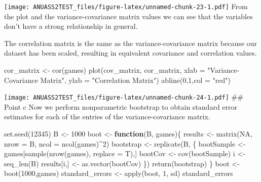 \documentclass[
]{article}
\newenvironment{Shaded}{\begin{snugshade}}{\end{snugshade}}
\newcommand{\AttributeTok}[1]{\textcolor[rgb]{0.77,0.63,0.00}{#1}}
\newcommand{\ConstantTok}[1]{\textcolor[rgb]{0.00,0.00,0.00}{#1}}
\newcommand{\ControlFlowTok}[1]{\textcolor[rgb]{0.13,0.29,0.53}{\textbf{#1}}}
\newcommand{\DecValTok}[1]{\textcolor[rgb]{0.00,0.00,0.81}{#1}}
\newcommand{\FunctionTok}[1]{\textcolor[rgb]{0.00,0.00,0.00}{#1}}
\newcommand{\NormalTok}[1]{#1}
\newcommand{\OtherTok}[1]{\textcolor[rgb]{0.56,0.35,0.01}{#1}}
\newcommand{\SpecialCharTok}[1]{\textcolor[rgb]{0.00,0.00,0.00}{#1}}
\newcommand{\StringTok}[1]{\textcolor[rgb]{0.31,0.60,0.02}{#1}}
\begin{document}
\texttt{[image: ANUASS2TEST\_files/figure-latex/unnamed-chunk-23-1.pdf]}
From the plot and the variance-covariance matrix values we can see that
the variables don't have a strong relationship in general.

The correlation matrix is the same as the variance-covariance matrix
because our dataset has been scaled, resulting in equivalent covariance
and correlation values.

\begin{Shaded}
\begin{Highlighting}[]
\NormalTok{cor\_matrix }\OtherTok{\textless{}{-}} \FunctionTok{cor}\NormalTok{(games)}
\FunctionTok{plot}\NormalTok{(cov\_matrix, cor\_matrix, }
     \AttributeTok{xlab =} \StringTok{"Variance{-}Covariance Matrix"}\NormalTok{,}
     \AttributeTok{ylab =} \StringTok{"Correlation Matrix"}\NormalTok{)}
\FunctionTok{abline}\NormalTok{(}\DecValTok{0}\NormalTok{,}\DecValTok{1}\NormalTok{,}\AttributeTok{col =} \StringTok{"red"}\NormalTok{)}
\end{Highlighting}
\end{Shaded}

\texttt{[image: ANUASS2TEST\_files/figure-latex/unnamed-chunk-24-1.pdf]}
\#\# Point c Now we perform nonparametric bootstrap to obtain standard
error estimates for each of the entries of the variance-covariance
matrix.

\begin{Shaded}
\begin{Highlighting}[]
\FunctionTok{set.seed}\NormalTok{(}\DecValTok{12345}\NormalTok{)}
\NormalTok{B }\OtherTok{\textless{}{-}} \DecValTok{1000}
\NormalTok{boot }\OtherTok{\textless{}{-}} \ControlFlowTok{function}\NormalTok{(B, games)\{}
\NormalTok{  results }\OtherTok{\textless{}{-}} \FunctionTok{matrix}\NormalTok{(}\ConstantTok{NA}\NormalTok{, }\AttributeTok{nrow =}\NormalTok{ B, }\AttributeTok{ncol =} \FunctionTok{ncol}\NormalTok{(games)}\SpecialCharTok{\^{}}\DecValTok{2}\NormalTok{)}
\NormalTok{  bootstrap }\OtherTok{\textless{}{-}} \FunctionTok{replicate}\NormalTok{(B, \{}
\NormalTok{    bootSample }\OtherTok{\textless{}{-}}\NormalTok{ games[}\FunctionTok{sample}\NormalTok{(}\FunctionTok{nrow}\NormalTok{(games), }\AttributeTok{replace =}\NormalTok{ T),]}
\NormalTok{    bootCov }\OtherTok{\textless{}{-}} \FunctionTok{cov}\NormalTok{(bootSample)}
\NormalTok{    i }\OtherTok{\textless{}{-}} \FunctionTok{seq\_len}\NormalTok{(B)}
\NormalTok{    results[i,] }\OtherTok{\textless{}{-}} \FunctionTok{as.vector}\NormalTok{(bootCov)}
\NormalTok{  \})}
  \FunctionTok{return}\NormalTok{(bootstrap)}
\NormalTok{\}}
\NormalTok{boot }\OtherTok{\textless{}{-}} \FunctionTok{boot}\NormalTok{(}\DecValTok{1000}\NormalTok{,games)}
\NormalTok{standard\_errors }\OtherTok{\textless{}{-}} \FunctionTok{apply}\NormalTok{(boot, }\DecValTok{1}\NormalTok{, sd)}
\NormalTok{standard\_errors}
\end{Highlighting}
\end{Shaded}
\end{document}

